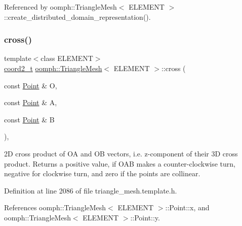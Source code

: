 Referenced by oomph\+::\+Triangle\+Mesh$<$ E\+L\+E\+M\+E\+N\+T $>$\+::create\+\_\+distributed\+\_\+domain\+\_\+representation().

\mbox{\label{classoomph_1_1TriangleMesh_a83f8fd5592a7ba062eec9390b7b84426}} 
\subsubsection{\texorpdfstring{cross()}{cross()}}
{\footnotesize\ttfamily template$<$class E\+L\+E\+M\+E\+NT$>$ \\
\hyperlink{classoomph_1_1TriangleMesh_afd4948d805e89116cc5da629e413a449}{coord2\+\_\+t} \hyperlink{classoomph_1_1TriangleMesh}{oomph\+::\+Triangle\+Mesh}$<$ E\+L\+E\+M\+E\+NT $>$\+::cross (\begin{DoxyParamCaption}\item[{const \hyperlink{structoomph_1_1TriangleMesh_1_1Point}{Point} \&}]{O,  }\item[{const \hyperlink{structoomph_1_1TriangleMesh_1_1Point}{Point} \&}]{A,  }\item[{const \hyperlink{structoomph_1_1TriangleMesh_1_1Point}{Point} \&}]{B }\end{DoxyParamCaption})\hspace{0.3cm}{\ttfamily [inline]}, {\ttfamily [private]}}



2D cross product of OA and OB vectors, i.\+e. z-\/component of their 3D cross product. Returns a positive value, if O\+AB makes a counter-\/clockwise turn, negative for clockwise turn, and zero if the points are collinear. 



Definition at line 2086 of file triangle\+\_\+mesh.\+template.\+h.



References oomph\+::\+Triangle\+Mesh$<$ E\+L\+E\+M\+E\+N\+T $>$\+::\+Point\+::x, and oomph\+::\+Triangle\+Mesh$<$ E\+L\+E\+M\+E\+N\+T $>$\+::\+Point\+::y.

\mbox{\label{classoomph_1_1TriangleMesh_ab4472dde562e25eaa590557a38ead8c3}} 

